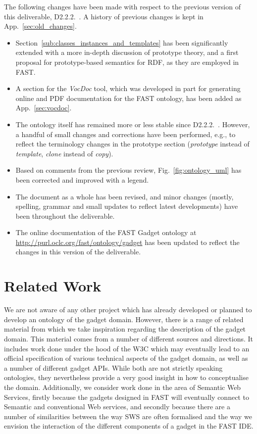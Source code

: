 \documentclass{article}
\begin{document}
The following changes have been made with respect to the previous version of this deliverable, D2.2.2.~\cite{moeller2010fast_ontology}. A history of previous changes is kept in App.~\ref{sec:old_changes}.

\begin{itemize}
	\item Section~\ref{sub:classes_instances_and_templates} has been significantly extended with a more in-depth discussion of prototype theory, and a first proposal for prototype-based semantics for RDF, as they are employed in FAST.
	\item A section for the \emph{VocDoc} tool, which was developed in part for generating online and PDF documentation for the FAST ontology, has been added as App.~\ref{sec:vocdoc}.
	\item The ontology itself has remained more or less stable since D2.2.2.~\cite{moeller2010fast_ontology}. However, a handful of small changes and corrections have been performed, e.g., to reflect the terminology changes in the prototype section (\emph{prototype} instead of \emph{template}, \emph{clone} instead of \emph{copy}).
	\item Based on comments from the previous review, Fig.~\ref{fig:ontology_uml} has been corrected and improved with a legend.
	\item The document as a whole has been revised, and minor changes (mostly, spelling, grammar and small updates to reflect latest developments) have been throughout the deliverable.
	\item The online documentation of the FAST Gadget ontology at \url{http://purl.oclc.org/fast/ontology/gadget} has been updated to reflect the changes in this version of the deliverable.
\end{itemize}



\clearpage
\section{Related Work} %
\label{sec:related_work}

We are not aware of any other project which has already developed or planned to develop an ontology of the gadget domain. However, there is a range of related material from which we take inspiration regarding the description of the gadget domain. This material comes from a number of different sources and directions. It includes work done under the hood of the W3C which may eventually lead to an official specification of various technical aspects of the gadget domain, as well as a number of different gadget APIs. While both are not strictly speaking ontologies, they nevertheless provide a very good insight in how to conceptualise the domain. Additionally, we consider work done in the area of Semantic Web Services, firstly because the gadgets designed in FAST will eventually connect to Semantic and conventional Web services, and secondly because there are a number of similarities between the way SWS are often formalised and the way we envision the interaction of the different components of a gadget in the FAST IDE.
\end{document}
